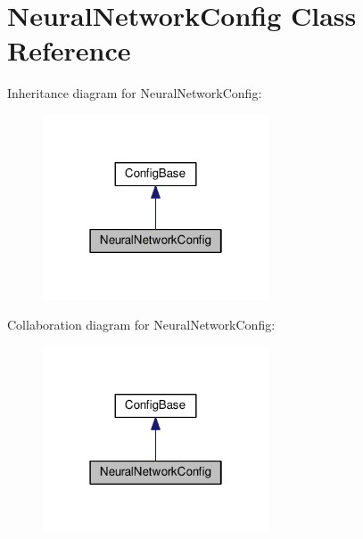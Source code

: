 \hypertarget{class_neural_network_config}{}\section{Neural\+Network\+Config Class Reference}
\label{class_neural_network_config}


Inheritance diagram for Neural\+Network\+Config\+:\nopagebreak
\begin{figure}[H]
\begin{center}
\leavevmode
\includegraphics[width=190pt]{class_neural_network_config__inherit__graph}
\end{center}
\end{figure}


Collaboration diagram for Neural\+Network\+Config\+:\nopagebreak
\begin{figure}[H]
\begin{center}
\leavevmode
\includegraphics[width=190pt]{class_neural_network_config__coll__graph}
\end{center}
\end{figure}
